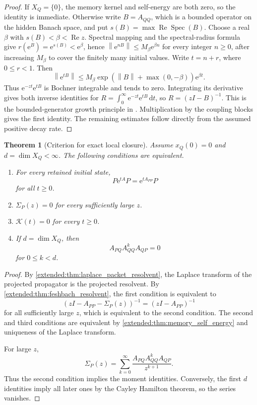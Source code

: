 \documentclass[11pt,a4paper]{article}
\newtheorem{theorem}{Theorem}[section]
\theoremstyle{definition}
\theoremstyle{remark}
\newcommand{\Spec}{\operatorname{Spec}}
\newcommand{\norm}[1]{\left\lVert#1\right\rVert}
\newcommand{\Kcal}{\mathcal K}
\newcommand{\e}{\mathrm e}
\newcommand{\dd}{\,\mathrm d}
\begin{document}
\begin{proof}
If \(X_Q=\{0\}\), the memory kernel and self-energy are both zero, so the identity is immediate. Otherwise write \(B=A_{QQ}\), which is a bounded operator on the hidden Banach space, and put \(s(B)=\max\operatorname{Re}\Spec(B)\). Choose a real \(\beta\) with \(s(B)<\beta<\operatorname{Re}z\). Spectral mapping and the spectral-radius formula give \(r(\e^B)=\e^{s(B)}<\e^\beta\), hence \(\norm{\e^{nB}}\leq M_\beta\e^{\beta n}\) for every integer \(n\geq0\), after increasing \(M_\beta\) to cover the finitely many initial values. Write \(t=n+r\), where \(0\leq r<1\). Then
\[
\norm{\e^{tB}}\leq M_\beta\exp(\norm B+\max(0,-\beta))\e^{\beta t}.
\]
Thus \(\e^{-zt}\e^{tB}\) is Bochner integrable and tends to zero. Integrating its derivative gives both inverse identities for \(R=\int_0^\infty\e^{-zt}\e^{tB}\dd t\), so \(R=(zI-B)^{-1}\). This is the bounded-generator growth principle in \cite[Chapter IV, Corollary 3.12]{EngelNagel2000}. Multiplication by the coupling blocks gives the first identity. The remaining estimates follow directly from the assumed positive decay rate.
\end{proof}

\begin{theorem}[Criterion for exact local closure]\label{extended:record:087}\label{extended:thm:local_closure}
Assume \(x_Q(0)=0\) and \(d=\dim X_Q<\infty\). The following conditions are equivalent.
\begin{enumerate}
\item For every retained initial state,
\[
P\e^{tA}P
=
\e^{tA_{PP}}P
\]
for all \(t\geq0\).
\item \(\Sigma_P(z)=0\) for every sufficiently large \(z\).
\item \(\Kcal(t)=0\) for every \(t\geq0\).
\item If \(d=\dim X_Q\), then
\[
A_{PQ}A_{QQ}^kA_{QP}=0
\]
for \(0\leq k<d\).
\end{enumerate}
\end{theorem}

\begin{proof}
By \cref{extended:thm:laplace_packet_resolvent}, the Laplace transform of the projected propagator is the projected resolvent. By \cref{extended:thm:feshbach_resolvent}, the first condition is equivalent to
\[
(zI-A_{PP}-\Sigma_P(z))^{-1}
=
(zI-A_{PP})^{-1}
\]
for all sufficiently large \(z\), which is equivalent to the second condition. The second and third conditions are equivalent by \cref{extended:thm:memory_self_energy} and uniqueness of the Laplace transform.

For large \(z\),
\[
\Sigma_P(z)
=
\sum_{k=0}^{\infty}
\frac{A_{PQ}A_{QQ}^kA_{QP}}{z^{k+1}}.
\]
Thus the second condition implies the moment identities. Conversely, the first \(d\) identities imply all later ones by the Cayley Hamilton theorem, so the series vanishes.
\end{proof}
\end{document}

